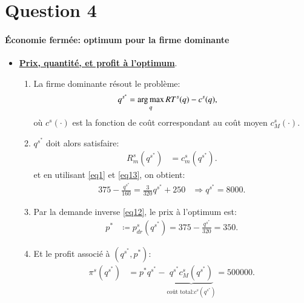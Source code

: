   \section{Question 4}
\frame{\sectionpage}
\begin{frame}
  [allowframebreaks]{\insertsection}
  \framesubtitle{Économie fermée: optimum pour la firme dominante}
  \begin{itemize}
  \item \underline{\textbf{Prix, quantité, et profit à l'optimum}}.
  \begin{enumerate}[$\cdot$]
  \item La firme dominante résout le problème:
  \begin{align*}
  q^{s^*} &=\argmax_q  RT^s(q) - c^s(q),
  \end{align*}
  où $c^s(\cdot)$ est la fonction de coût correspondant au coût moyen $c_M^s(\cdot)$. 
  \item $q^{s^*} $ doit alors satisfaire:
  \begin{align*}
   R^s_m(q^{s^*}) &= c_m^s(q^{s^*}).
  \end{align*}
  et en utilisant \eqref{eq1} et \eqref{eq13}, on obtient:
  \begin{align*}
  375-  \frac{q^{s^*}}{160} = \frac{3}{320}q^{s^*} + 250&\Rightarrow  q^{s^*} = 8000.
  \end{align*}
  \item Par la demande inverse \eqref{eq12}, le prix à l'optimum est:
  \begin{align*}
  p^*&\coloneqq  p_{dr}^s(q^{s^*})  = 375 - \frac{q^{s^*}}{320} = 350.
  \end{align*}
  \item Et le profit associé à $(q^{s^*}, p^*)$:
  \begin{align*}
  \pi^s(q^{s^*}) &= p^*q^{s^*} - \underbrace{q^{s^*} c_M^s(q^{s^*})}_{\text{coût total:} c^s(q^{s^*})} = 500000.
  \end{align*}
  \end{enumerate}
  \end{itemize}
  \end{frame}
  
